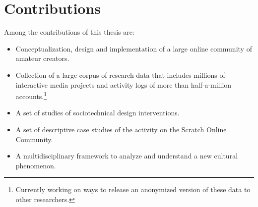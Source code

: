 \chapter{Contributions}

Among the contributions of this thesis are:
\begin{itemize}
\item Conceptualization, design and implementation of a large online community of amateur creators.
\item Collection of a large corpus of research data that includes millions of interactive media projects and activity logs of more than half-a-million accounts.\footnote{Currently working on ways to release an anonymized version of these data to other researchers.}
\item A set of studies of sociotechnical design interventions.
\item A set of descriptive case studies of the activity on the Scratch Online Community.
\item A multidisciplinary framework to analyze and understand a new cultural phenomenon.
\end{itemize}
